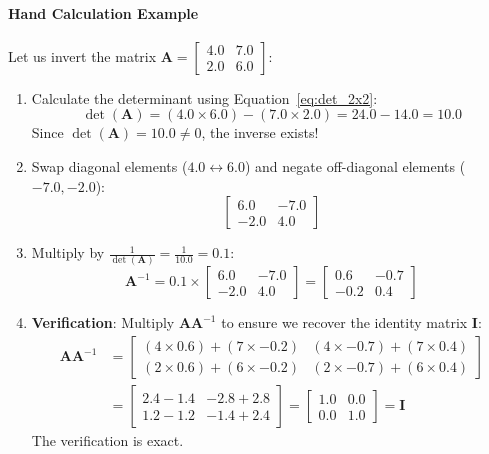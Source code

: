 \paragraph{Hand Calculation Example}
Let us invert the matrix $\mathbf{A} = \begin{bmatrix} 4.0 & 7.0 \\ 2.0 & 6.0 \end{bmatrix}$:
\begin{enumerate}
    \item Calculate the determinant using Equation~\ref{eq:det_2x2}:
    \begin{equation*}
    \det(\mathbf{A}) = (4.0 \times 6.0) - (7.0 \times 2.0) = 24.0 - 14.0 = 10.0
    \end{equation*}
    Since $\det(\mathbf{A}) = 10.0 \ne 0$, the inverse exists!
    \item Swap diagonal elements ($4.0 \leftrightarrow 6.0$) and negate off-diagonal elements ($-7.0, -2.0$):
    \begin{equation*}
    \begin{bmatrix} 6.0 & -7.0 \\ -2.0 & 4.0 \end{bmatrix}
    \end{equation*}
    \item Multiply by $\frac{1}{\det(\mathbf{A})} = \frac{1}{10.0} = 0.1$:
    \begin{equation*}
    \mathbf{A}^{-1} = 0.1 \times \begin{bmatrix} 6.0 & -7.0 \\ -2.0 & 4.0 \end{bmatrix} = \begin{bmatrix} 0.6 & -0.7 \\ -0.2 & 0.4 \end{bmatrix}
    \end{equation*}
    \item \textbf{Verification}: Multiply $\mathbf{A}\mathbf{A}^{-1}$ to ensure we recover the identity matrix $\mathbf{I}$:
    \begin{align*}
    \mathbf{A}\mathbf{A}^{-1} &= \begin{bmatrix} (4 \times 0.6) + (7 \times -0.2) & (4 \times -0.7) + (7 \times 0.4) \\ (2 \times 0.6) + (6 \times -0.2) & (2 \times -0.7) + (6 \times 0.4) \end{bmatrix} \\
    &= \begin{bmatrix} 2.4 - 1.4 & -2.8 + 2.8 \\ 1.2 - 1.2 & -1.4 + 2.4 \end{bmatrix} = \begin{bmatrix} 1.0 & 0.0 \\ 0.0 & 1.0 \end{bmatrix} = \mathbf{I}
    \end{align*}
    The verification is exact.
\end{enumerate}

